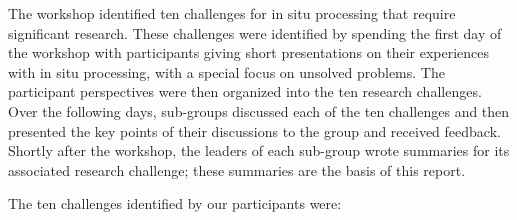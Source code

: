 

\noindent
The workshop identified ten challenges for in situ processing that require significant research.
%
These challenges were identified by spending the first day of the workshop with participants giving short
presentations on their experiences with in situ processing, with a special focus on unsolved problems.
%
The participant perspectives were then organized into the ten research challenges.
%
Over the following days, 
 sub-groups  discussed each of the ten challenges and then presented the key points of their discussions to the group and received feedback.
%
Shortly after the workshop, the leaders of each sub-group wrote summaries for its associated research challenge; these summaries are the basis of this report.

\medskip\noindent
The ten challenges identified by our participants were:


